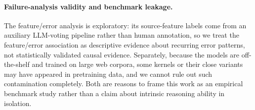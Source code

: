 \paragraph{Failure-analysis validity and benchmark leakage.}
The feature/error analysis is exploratory: its source-feature labels come from an auxiliary LLM-voting pipeline rather than human annotation, so we treat the feature/error association as descriptive evidence about recurring error patterns, not statistically validated causal evidence.
Separately, because the models are off-the-shelf and trained on large web corpora, some kernels or their close variants may have appeared in pretraining data, and we cannot rule out such contamination completely.
Both are reasons to frame this work as an empirical benchmark study rather than a claim about intrinsic reasoning ability in isolation.
